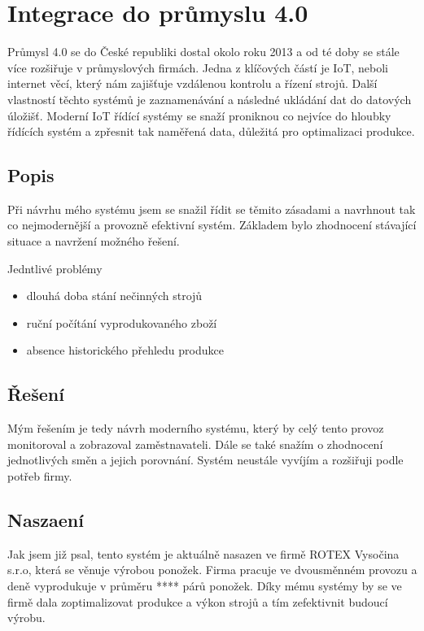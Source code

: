 \chapter{Integrace do průmyslu 4.0}
Průmysl 4.0 se do České republiki dostal okolo roku 2013 a od té doby se stále více rozšiřuje v průmyslových firmách.
Jedna z klíčových částí je IoT, neboli internet věcí, který nám zajišťuje vzdálenou kontrolu a řízení strojů.
Další vlastností těchto systémů je zaznamenávání a následné ukládání dat do datových úložišť.
Moderní IoT řídící systémy se snaží proniknou co nejvíce do hloubky řídících systém a zpřesnit tak naměřená data, důležitá pro optimalizaci produkce.   

\section{Popis}
Při návrhu mého systému jsem se snažil řídit se těmito zásadami a navrhnout tak co nejmodernější a provozně efektivní systém.
Základem bylo zhodnocení stávající situace a navržení možného řešení.

Jedntlivé problémy
\begin{itemize}
    \item dlouhá doba stání nečinných strojů
    \item ruční počítání vyprodukovaného zboží
    \item absence historického přehledu produkce
\end{itemize}

\section{Řešení}
Mým řešením je tedy návrh moderního systému, který by celý tento provoz monitoroval a zobrazoval zaměstnavateli.
Dále se také snažím o zhodnocení jednotlivých směn a jejich porovnání.
Systém neustále vyvíjím a rozšiřuji podle potřeb firmy.

\section{Naszaení}
Jak jsem již psal, tento systém je aktuálně nasazen ve firmě ROTEX Vysočina s.r.o\cite{ROTEX}, která se věnuje výrobou ponožek. 
Firma pracuje ve dvousměnném provozu a deně vyprodukuje v průměru **** párů ponožek.
Díky mému systémy by se ve firmě dala zoptimalizovat produkce a výkon strojů a tím zefektivnit budoucí výrobu. 

